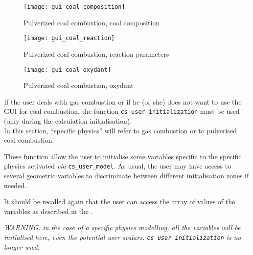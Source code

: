 \begin{figure}[!ht]
\begin{center}
\texttt{[image: gui\_coal\_composition]}
\caption{Pulverized coal combustion, coal composition}
\label{fig:Ini-coal3}
\end{center}
\end{figure}

\begin{figure}[!ht]
\begin{center}
\texttt{[image: gui\_coal\_reaction]}
\caption{Pulverized coal combustion, reaction parameters}
\label{fig:Ini-coal4}
\end{center}
\end{figure}

\begin{figure}[!ht]
\begin{center}
\texttt{[image: gui\_coal\_oxydant]}
\caption{Pulverized coal combustion, oxydant}
\label{fig:Ini-coal5}
\end{center}
\end{figure}

If the user deals with gas combustion or if he (or she) does not want to use the
GUI for coal combustion, the function \texttt{cs\_user\_initialization} must be used (only during the calculation initialisation).\\
In this section, ``specific physics'' will refer to gas combustion or
to pulverised coal combustion.

These function allow the user to initialise some variables specific
to the specific physics activated {\em via} \texttt{cs\_user\_model}. As usual,
the user may have access to several geometric variables to discriminate
between different initialisation zones if needed.

It should be recalled again that the user can access the array of values of the
variables as described in the .

{\em WARNING: in the case of a specific physics modelling, all the
variables will be initialised here, even the potential user scalars: {\em
\texttt{cs\_user\_initialization}} is no longer used.}



